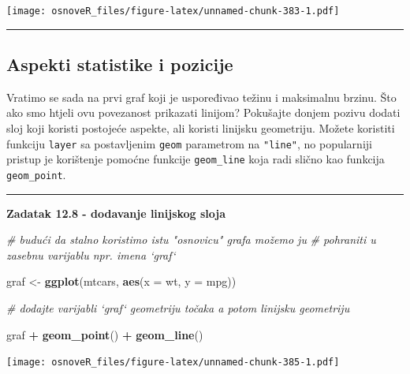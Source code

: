 \documentclass[]{book}
\newenvironment{Shaded}{\begin{snugshade}}{\end{snugshade}}
\newcommand{\KeywordTok}[1]{\textcolor[rgb]{0.13,0.29,0.53}{\textbf{#1}}}
\newcommand{\DataTypeTok}[1]{\textcolor[rgb]{0.13,0.29,0.53}{#1}}
\newcommand{\StringTok}[1]{\textcolor[rgb]{0.31,0.60,0.02}{#1}}
\newcommand{\CommentTok}[1]{\textcolor[rgb]{0.56,0.35,0.01}{\textit{#1}}}
\newcommand{\OperatorTok}[1]{\textcolor[rgb]{0.81,0.36,0.00}{\textbf{#1}}}
\newcommand{\NormalTok}[1]{#1}
\theoremstyle{definition}
\theoremstyle{definition}
\theoremstyle{definition}
\theoremstyle{remark}
\begin{document}
\texttt{[image: osnoveR\_files/figure-latex/unnamed-chunk-383-1.pdf]}

\begin{center}\rule{0.5\linewidth}{\linethickness}\end{center}

\subsection{Aspekti statistike i
pozicije}\label{aspekti-statistike-i-pozicije}

Vratimo se sada na prvi graf koji je uspoređivao težinu i maksimalnu
brzinu. Što ako smo htjeli ovu povezanost prikazati linijom? Pokušajte
donjem pozivu dodati sloj koji koristi postojeće aspekte, ali koristi
linijsku geometriju. Možete koristiti funkciju \texttt{layer} sa
postavljenim \texttt{geom} parametrom na \texttt{"line"}, no popularniji
pristup je korištenje pomoćne funkcije \texttt{geom\_line} koja radi
slično kao funkcija \texttt{geom\_point}.

\begin{center}\rule{0.5\linewidth}{\linethickness}\end{center}

\textbf{Zadatak 12.8 - dodavanje linijskog sloja}

\begin{Shaded}
\begin{Highlighting}[]
\CommentTok{# budući da stalno koristimo istu "osnovicu" grafa možemo ju}
\CommentTok{# pohraniti u zasebnu varijablu npr. imena `graf`}

\NormalTok{graf <-}\StringTok{ }\KeywordTok{ggplot}\NormalTok{(mtcars, }\KeywordTok{aes}\NormalTok{(}\DataTypeTok{x =}\NormalTok{ wt, }\DataTypeTok{y =}\NormalTok{ mpg)) }

\CommentTok{# dodajte varijabli `graf` geometriju točaka a potom linijsku geometriju}
\end{Highlighting}
\end{Shaded}

\begin{Shaded}
\begin{Highlighting}[]
\NormalTok{graf }\OperatorTok{+}\StringTok{ }\KeywordTok{geom_point}\NormalTok{() }\OperatorTok{+}\StringTok{ }\KeywordTok{geom_line}\NormalTok{()}
\end{Highlighting}
\end{Shaded}

\texttt{[image: osnoveR\_files/figure-latex/unnamed-chunk-385-1.pdf]}
\end{document}

